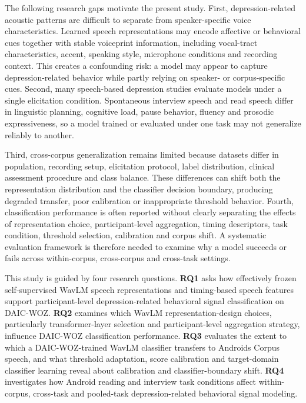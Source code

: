 \documentclass[lettersize,journal]{IEEEtran}
\begin{document}
The following research gaps motivate the present study. First, depression-related acoustic patterns are difficult to separate from speaker-specific voice characteristics. Learned speech representations may encode affective or behavioral cues together with stable voiceprint information, including vocal-tract characteristics, accent, speaking style, microphone conditions and recording context. This creates a confounding risk: a model may appear to capture depression-related behavior while partly relying on speaker- or corpus-specific cues. Second, many speech-based depression studies evaluate models under a single elicitation condition. Spontaneous interview speech and read speech differ in linguistic planning, cognitive load, pause behavior, fluency and prosodic expressiveness, so a model trained or evaluated under one task may not generalize reliably to another.

Third, cross-corpus generalization remains limited because datasets differ in population, recording setup, elicitation protocol, label distribution, clinical assessment procedure and class balance. These differences can shift both the representation distribution and the classifier decision boundary, producing degraded transfer, poor calibration or inappropriate threshold behavior. Fourth, classification performance is often reported without clearly separating the effects of representation choice, participant-level aggregation, timing descriptors, task condition, threshold selection, calibration and corpus shift. A systematic evaluation framework is therefore needed to examine why a model succeeds or fails across within-corpus, cross-corpus and cross-task settings.

This study is guided by four research questions. \textbf{RQ1} asks how effectively frozen self-supervised WavLM speech representations and timing-based speech features support participant-level depression-related behavioral signal classification on DAIC-WOZ. \textbf{RQ2} examines which WavLM representation-design choices, particularly transformer-layer selection and participant-level aggregation strategy, influence DAIC-WOZ classification performance. \textbf{RQ3} evaluates the extent to which a DAIC-WOZ-trained WavLM classifier transfers to Androids Corpus speech, and what threshold adaptation, score calibration and target-domain classifier learning reveal about calibration and classifier-boundary shift. \textbf{RQ4} investigates how Android reading and interview task conditions affect within-corpus, cross-task and pooled-task depression-related behavioral signal modeling.
\end{document}
